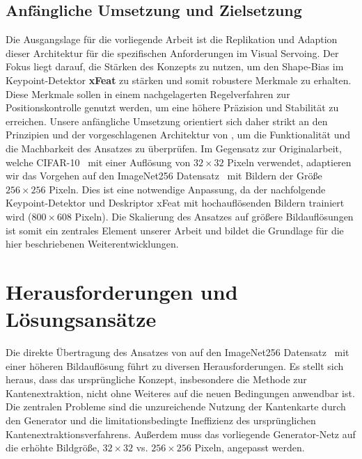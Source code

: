 \subsection{Anfängliche Umsetzung und Zielsetzung}
Die Ausgangslage für die vorliegende Arbeit ist die Replikation und Adaption dieser Architektur für die spezifischen Anforderungen im Visual Servoing. Der Fokus liegt darauf, die Stärken des Konzepts zu nutzen, um den Shape-Bias im Keypoint-Detektor \textbf{\ac{xFeat}} zu stärken und somit robustere Merkmale zu erhalten. Diese Merkmale sollen in einem nachgelagerten Regelverfahren zur Positionskontrolle genutzt werden, um eine höhere Präzision und Stabilität zu erreichen. Unsere anfängliche Umsetzung orientiert sich daher strikt an den Prinzipien und der vorgeschlagenen Architektur von \textcite{He_2023_ICCV}, um die Funktionalität und die Machbarkeit des Ansatzes zu überprüfen. Im Gegensatz zur Originalarbeit, welche CIFAR-10~\cite{krizhevsky2009learning} mit einer Auflösung von $32 \times 32$ Pixeln verwendet, adaptieren wir das Vorgehen auf den ImageNet256 Datensatz~\cite{Uriot2023imageNet} mit Bildern der Größe $256 \times 256$ Pixeln. Dies ist eine notwendige Anpassung, da der nachfolgende Keypoint-Detektor und Deskriptor \ac{xFeat} mit hochauflösenden Bildern trainiert wird ($800 \times 608$ Pixeln). Die Skalierung des Ansatzes auf größere Bildauflösungen ist somit ein zentrales Element unserer Arbeit und bildet die Grundlage für die hier beschriebenen Weiterentwicklungen.





\section{Herausforderungen und Lösungsansätze}
\label{sec:HerausforderungenUndLoesungsansaetze}
Die direkte Übertragung des Ansatzes von \textcite{He_2023_ICCV} auf den ImageNet256 Datensatz~\cite{Uriot2023imageNet} mit einer höheren Bildauflösung führt zu diversen Herausforderungen. Es stellt sich heraus, dass das ursprüngliche Konzept, insbesondere die Methode zur Kantenextraktion, nicht ohne Weiteres auf die neuen Bedingungen anwendbar ist. Die zentralen Probleme sind die unzureichende Nutzung der Kantenkarte durch den Generator und die limitationsbedingte Ineffizienz des ursprünglichen Kantenextraktionsverfahrens. Außerdem muss das vorliegende Generator-Netz auf die erhöhte Bildgröße, $32 \times 32$ vs. $256 \times 256$ Pixeln, angepasst werden.





